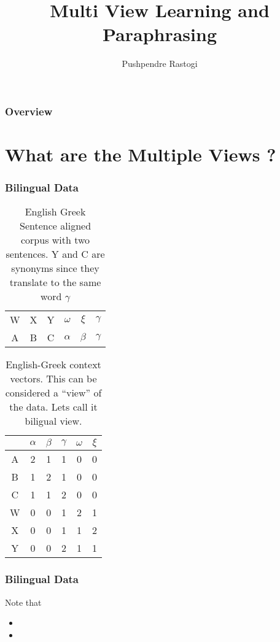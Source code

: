 \documentclass{beamer}
\title[Multi View {PPDB}]{Multi View Learning and Paraphrasing}
\author{Pushpendre Rastogi}
\institute[JHU] 
{
Johns Hopkins University \\ 
\medskip
\textit{pushpendre@jhu.edu} 
}
\date{}
\begin{document}
\begin{frame}
\titlepage 
\end{frame}

\begin{frame}
\frametitle{Overview} 
\tableofcontents 
\end{frame}


\section{What are the Multiple Views ?}
  
\begin{frame}
\frametitle{Bilingual Data}
\begin{table}[htbp]
  \centering
  \begin{tabular}{c c c | c c c}
    W& X& Y& $\omega$& $\xi$& $\gamma$\\
    A& B& C& $\alpha$& $\beta$& $\gamma$\\
  \end{tabular}
  \caption{English Greek Sentence aligned corpus with two sentences. Y
  and C are synonyms since they translate to the same word $\gamma$}
  \label{tab:example1-1}
\end{table}
\begin{table}[htbp]
  \centering
  \begin{tabular}{c | c c c c c}
    & \textbf{$\alpha$} & \textbf{$\beta$} & \textbf{$\gamma$} &
    \textbf{$\omega$} & \textbf{$\xi$} \\
    \hline
    A& 2& 1& 1& 0& 0\\ 
    B& 1& 2& 1& 0& 0\\
    C& 1& 1& 2& 0& 0\\
    W& 0& 0& 1& 2& 1\\
    X& 0& 0& 1& 1& 2\\
    Y& 0& 0& 2& 1& 1\\
  \end{tabular}
  \caption{English-Greek context vectors. This can be considered a
    ``view'' of the data. Lets call it biligual view.}
  \label{tab:example1-2}
\end{table}

\end{frame}

\begin{frame}
  \frametitle{Bilingual Data}
  Note that
  \begin{itemize}
    \item 
    \item 
  \end{itemize}
\end{frame}
\end{document}

